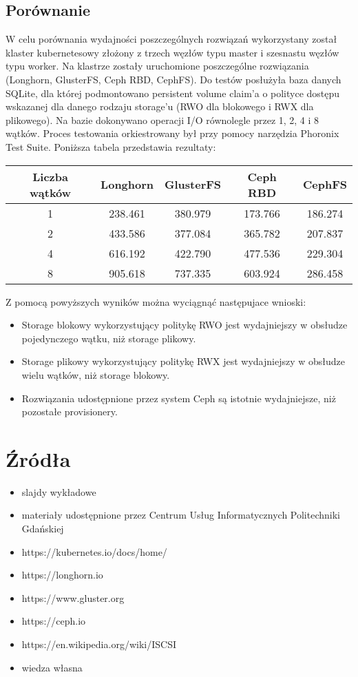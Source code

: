\documentclass[polish,envcountsect,10pt]{article}
\begin{document}
\subsection{Porównanie}

W celu porównania wydajności poszczególnych rozwiązań wykorzystany został klaster kubernetesowy złożony z trzech węzłów typu master i szesnastu węzłów typu worker. Na klastrze zostały uruchomione poszczególne rozwiązania (Longhorn, GlusterFS, Ceph RBD, CephFS). Do testów posłużyła baza danych SQLite, dla której podmontowano persistent volume claim'a o polityce dostępu wskazanej dla danego rodzaju storage'u (RWO dla blokowego i RWX dla plikowego). Na bazie dokonywano operacji I/O równolegle przez 1, 2, 4 i 8 wątków. Proces testowania orkiestrowany był przy pomocy narzędzia Phoronix Test Suite. Poniższa tabela przedstawia rezultaty:

\begin{center}
	\begin{tabular}{ | c | c | c | c | c | } 
    \hline
	Liczba wątków & Longhorn & GlusterFS & Ceph RBD & CephFS \\
	\hline
	1 & 238.461 & 380.979 & 173.766 & 186.274 \\
	\hline
	2 & 433.586 & 377.084 & 365.782 & 207.837 \\
	\hline
	4 & 616.192 & 422.790 & 477.536 & 229.304 \\
	\hline
	8 & 905.618 & 737.335 & 603.924 & 286.458 \\
	\hline
\end{tabular}
\end{center}

Z pomocą powyższych wyników można wyciągnąć następujace wnioski:
\begin{itemize}
	\item Storage blokowy wykorzystujący politykę RWO jest wydajniejszy w obsłudze pojedynczego wątku, niż storage plikowy.
	\item Storage plikowy wykorzystujący politykę RWX jest wydajniejszy w obsłudze wielu wątków, niż storage blokowy.
	\item Rozwiązania udostępnione przez system Ceph są istotnie wydajniejsze, niż pozostałe provisionery.
\end{itemize}

\section{Źródła}

\begin{itemize}
	\item slajdy wykładowe
	\item materiały udostępnione przez Centrum Usług Informatycznych Politechniki Gdańskiej
	\item https://kubernetes.io/docs/home/
	\item https://longhorn.io
	\item https://www.gluster.org
	\item https://ceph.io
	\item https://en.wikipedia.org/wiki/ISCSI
	\item wiedza własna
\end{itemize}
\end{document}
